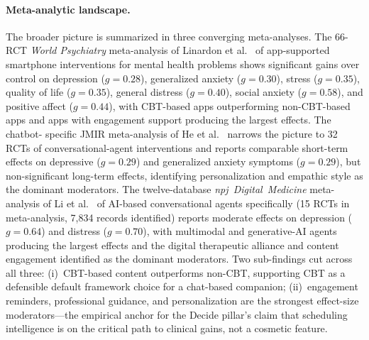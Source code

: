 \documentclass[11pt,a4paper]{article}
\begin{document}
\paragraph{Meta-analytic landscape.}
The broader picture is summarized in three converging
meta-analyses. The 66-RCT \emph{World Psychiatry} meta-analysis of
Linardon et al.~\cite{Linardon2019Meta} of app-supported
smartphone interventions for mental health problems shows
significant gains over control on depression ($g\!=\!0.28$),
generalized anxiety ($g\!=\!0.30$), stress ($g\!=\!0.35$), quality
of life ($g\!=\!0.35$), general distress ($g\!=\!0.40$), social
anxiety ($g\!=\!0.58$), and positive affect ($g\!=\!0.44$), with
CBT-based apps outperforming non-CBT-based apps and apps with
engagement support producing the largest effects. The chatbot-
specific JMIR meta-analysis of He et al.~\cite{He2023CASRMeta}
narrows the picture to 32 RCTs of conversational-agent
interventions and reports comparable short-term effects on
depressive ($g\!=\!0.29$) and generalized anxiety symptoms
($g\!=\!0.29$), but non-significant long-term effects, identifying
personalization and empathic style as the dominant moderators. The
twelve-database \emph{npj~Digital~Medicine} meta-analysis of Li et
al.~\cite{Li2023AICAMeta} of AI-based conversational agents
specifically (15 RCTs in meta-analysis, 7{,}834 records identified)
reports moderate effects on depression ($g\!=\!0.64$) and distress
($g\!=\!0.70$), with multimodal and generative-AI agents producing
the largest effects and the digital therapeutic alliance and
content engagement identified as the dominant moderators. Two
sub-findings cut across all three: (i)~CBT-based content
outperforms non-CBT, supporting CBT as a defensible default
framework choice for a chat-based companion; (ii)~engagement
reminders, professional guidance, and personalization are the
strongest effect-size moderators---the empirical anchor for the
Decide pillar's claim that scheduling intelligence is on the
critical path to clinical gains, not a cosmetic feature.
\end{document}
